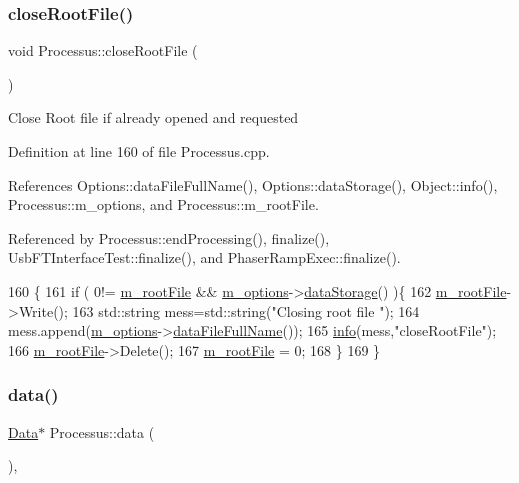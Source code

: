 \subsubsection{\texorpdfstring{close\+Root\+File()}{closeRootFile()}}
{\footnotesize\ttfamily void Processus\+::close\+Root\+File (\begin{DoxyParamCaption}{ }\end{DoxyParamCaption})\hspace{0.3cm}{\ttfamily [inherited]}}

Close Root file if already opened and requested 

Definition at line 160 of file Processus.\+cpp.



References Options\+::data\+File\+Full\+Name(), Options\+::data\+Storage(), Object\+::info(), Processus\+::m\+\_\+options, and Processus\+::m\+\_\+root\+File.



Referenced by Processus\+::end\+Processing(), finalize(), Usb\+F\+T\+Interface\+Test\+::finalize(), and Phaser\+Ramp\+Exec\+::finalize().


\begin{DoxyCode}
160                                 \{
161   \textcolor{keywordflow}{if} ( 0!= \hyperlink{classProcessus_a76114f8cf2111e910c323a7ae05a015d}{m\_rootFile} && \hyperlink{classProcessus_a74205f3c1e00c4448f7b3257c2351797}{m\_options}->\hyperlink{classOptions_aed7799d10139fa542055b982cb820192}{dataStorage}() )\{
162     \hyperlink{classProcessus_a76114f8cf2111e910c323a7ae05a015d}{m\_rootFile}->Write();
163         std::string mess=std::string(\textcolor{stringliteral}{"Closing root file "});
164         mess.append(\hyperlink{classProcessus_a74205f3c1e00c4448f7b3257c2351797}{m\_options}->\hyperlink{classOptions_ab1cd9f237e9c18fd72323c74565453f8}{dataFileFullName}());
165         \hyperlink{classObject_a644fd329ea4cb85f54fa6846484b84a8}{info}(mess,\textcolor{stringliteral}{"closeRootFile"});
166     \hyperlink{classProcessus_a76114f8cf2111e910c323a7ae05a015d}{m\_rootFile}->Delete();
167     \hyperlink{classProcessus_a76114f8cf2111e910c323a7ae05a015d}{m\_rootFile} = 0;
168   \}
169 \}
\end{DoxyCode}
\mbox{\label{classProcessus_a16e45f329fbce935aeef0ff3cb508228}} 
\subsubsection{\texorpdfstring{data()}{data()}\hspace{0.1cm}{\footnotesize\ttfamily [1/3]}}
{\footnotesize\ttfamily \hyperlink{classData}{Data}$\ast$ Processus\+::data (\begin{DoxyParamCaption}{ }\end{DoxyParamCaption})\hspace{0.3cm}{\ttfamily [inline]}, {\ttfamily [inherited]}}


